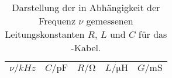 \begin{table}[htpb]
	\centering
	\begin{tabular}{ccccc}
		\midrule
		\midrule
		$\nu / \si{kHz}$        & $C / \si{\pico\farad}$     & $R / \si{\ohm}$ &
		$L / \si{\micro\henry}$ & $G / \si{\milli\siemens}$ \\
		\midrule
		
		\midrule
		\midrule
	\end{tabular}
	\caption{Darstellung der in Abhängigkeit der Frequenz $\nu$ gemessenen
		Leitungskonstanten $R$, $L$ und $C$ für das \BU-Kabel.}
\label{tab:Leitungskonstanten_75k}
\end{table}
